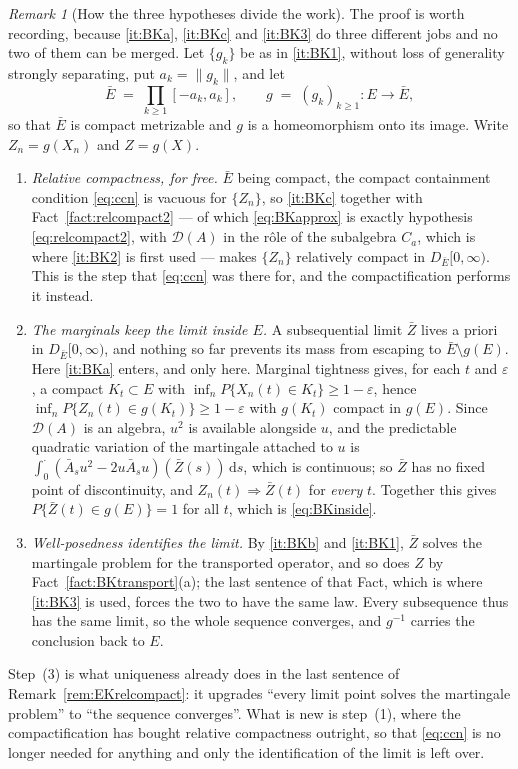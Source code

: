 \documentclass[11pt,a4paper]{article}
\theoremstyle{plain}
\theoremstyle{definition}
\theoremstyle{remark}
\newtheorem{remark}[theorem]{Remark}
\newcommand{\dom}{\mathcal{D}}                 %
\newcommand{\dif}{\,\mathrm{d}}
\DeclareMathOperator*{\wto}{\Rightarrow}
\begin{document}
\begin{remark}[How the three hypotheses divide the work]
  \label{rem:BKmechanism}
  The proof is worth recording, because \ref{it:BKa}, \ref{it:BKc} and
  \ref{it:BK3} do three different jobs and no two of them can be merged.  Let
  $\{g_k\}$ be as in \ref{it:BK1}, without loss of generality strongly
  separating, put $a_k = \lVert g_k \rVert$, and let
  \[
    \bar E \;=\; \prod_{k \geq 1} [-a_k, a_k], \qquad
    g \;=\; (g_k)_{k \geq 1} : E \to \bar E ,
  \]
  so that $\bar E$ is compact metrizable and $g$ is a homeomorphism onto its
  image.  Write $Z_n = g(X_n)$ and $Z = g(X)$.
  \begin{enumerate}[label=(\arabic*)]
  \item \emph{Relative compactness, for free.}  $\bar E$ being compact, the
    compact containment condition \eqref{eq:ccn} is vacuous for $\{Z_n\}$, so
    \ref{it:BKc} together with Fact~\ref{fact:relcompact2} --- of which
    \eqref{eq:BKapprox} is exactly hypothesis \eqref{eq:relcompact2}, with
    $\dom(A)$ in the r\^ole of the subalgebra $C_a$, which is where \ref{it:BK2}
    is first used --- makes $\{Z_n\}$ relatively compact in
    $D_{\bar E}[0,\infty)$.  This is the step that \eqref{eq:ccn} was there for,
    and the compactification performs it instead.
  \item \emph{The marginals keep the limit inside $E$.}  A subsequential limit
    $\bar Z$ lives a priori in $D_{\bar E}[0,\infty)$, and nothing so far
    prevents its mass from escaping to $\bar E \setminus g(E)$.  Here
    \ref{it:BKa} enters, and only here.  Marginal tightness gives, for each $t$
    and $\varepsilon$, a compact $K_t \subset E$ with
    $\inf_n P\{X_n(t) \in K_t\} \geq 1 - \varepsilon$, hence
    $\inf_n P\{Z_n(t) \in g(K_t)\} \geq 1 - \varepsilon$ with $g(K_t)$ compact in
    $g(E)$.  Since $\dom(A)$ is an algebra, $u^2$ is available alongside $u$, and
    the predictable quadratic variation of the martingale attached to $u$ is
    $\int_0^{\cdot}(\bar A_su^2 - 2u \bar A_su)(\bar Z(s))\dif s$, which is
    continuous; so $\bar Z$ has no fixed point of discontinuity, and
    $Z_n(t) \wto \bar Z(t)$ for \emph{every} $t$.  Together this gives
    $P\{\bar Z(t) \in g(E)\} = 1$ for all $t$, which is \eqref{eq:BKinside}.
  \item \emph{Well-posedness identifies the limit.}  By \ref{it:BKb} and
    \ref{it:BK1}, $\bar Z$ solves the martingale problem for the transported
    operator, and so does $Z$ by Fact~\ref{fact:BKtransport}(a); the last
    sentence of that Fact, which is where \ref{it:BK3} is used, forces the two to
    have the same law.  Every subsequence thus has the same limit, so the whole sequence
    converges, and $g^{-1}$ carries the conclusion back to $E$.
  \end{enumerate}
  Step~(3) is what uniqueness already does in the last sentence of
  Remark~\ref{rem:EKrelcompact}: it upgrades ``every limit point solves the
  martingale problem'' to ``the sequence converges''.  What is new is step~(1),
  where the compactification has bought relative compactness outright, so that
  \eqref{eq:ccn} is no longer needed for anything and only the identification of
  the limit is left over.
\end{remark}
\end{document}
